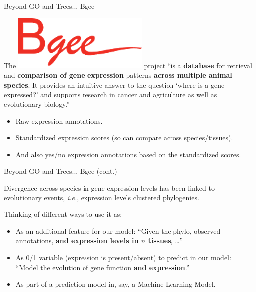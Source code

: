 \documentclass[10pt,aspectratio=169]{beamer}
\newcounter{frame}[frame]
\begin{document}
\begin{frame}{Beyond GO and Trees... Bgee}


The \includegraphics[width=.1\linewidth]{fig/bgee_logo.png} project ``is a \textbf{database} for retrieval and \textbf{comparison of gene expression} patterns \textbf{across multiple animal species}. It provides an intuitive answer to the question `where is a gene expressed?' and supports research in cancer and agriculture as well as evolutionary biology.'' -- \textcite{bastianBgeeSuiteIntegrated2021}

\begin{itemize}
    \item Raw expression annotations.
    \item Standardized expression scores (so can compare across species/tissues).
    \item And also yes/no expression annotations based on the standardized scores.
\end{itemize}

\end{frame}

\begin{frame}{Beyond GO and Trees... Bgee (cont.)}

Divergence across species in gene expression levels has been linked to evolutionary events\autocite{nabholzHighLevelsGene2013, hodgins-davisEvolvingGeneExpression2009}, \textit{i.e.}, expression levels clustered phylogenies.\\\bigskip

Thinking of different ways to use it as:\\\bigskip

\begin{itemize}
    \item As an additional feature for our model: ``Given the phylo, observed annotations, \textbf{and expression levels in $n$ tissues}, \dots''
    \item As 0/1 variable (expression is present/absent) to predict in our model: ``Model the evolution of gene function \textbf{and expression}.''
    \item As part of a prediction model in, say, a Machine Learning Model.
\end{itemize}

    
\end{frame}


\end{document}

